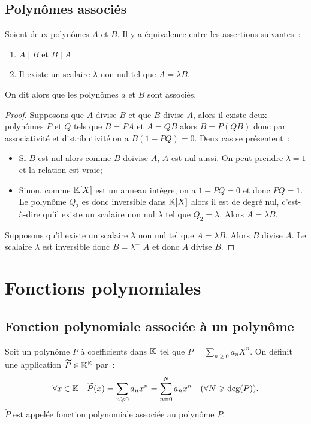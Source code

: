 \subsection{Polynômes associés}

\begin{prop}
  Soient deux polynômes \(A\) et \(B\). Il y a équivalence entre les assertions suivantes~:
  \begin{enumerate}
  \item \(A\mid{}B\) et \(B\mid{}A\)
  \item Il existe un scalaire \(\lambda\) non nul tel que \(A=\lambda B\).
  \end{enumerate}
  On dit alors que les polynômes \(a\) et \(B\) sont associés.
\end{prop}

\begin{proof}
  Supposons que \(A\) divise \(B\) et que \(B\) divise \(A\), alors il existe deux polynômes \(P\) et \(Q\) tels que \(B=PA\) et \(A=QB\) alors \(B=P(QB)\) donc par associativité et distributivité on a \(B(1-PQ)=0\). Deux cas se présentent~:
  \begin{itemize}
  \item Si \(B\) est nul alors comme \(B\) doivise \(A\), \(A\) est nul aussi. On peut prendre \(\lambda=1\) et la relation est vraie;
  \item Sinon, comme \(\mathbb{K}[X]\) est un anneau intègre, on a \(1-PQ=0\) et donc \(PQ=1\). Le polynôme \(Q_2\) es donc inversible dans \(\mathbb{K}[X]\) alors il est de degré nul, c'est-à-dire qu'il existe un scalaire non nul \(\lambda\) tel que \(Q_2=\lambda\). Alors \(A=\lambda B\).
  \end{itemize}

  Supposons qu'il existe un scalaire \(\lambda\) non nul tel que \(A=\lambda B\). Alors \(B\) divise \(A\). Le scalaire \(\lambda\) est inversible donc \(B=\lambda^{-1}A\) et donc \(A\) divise \(B\).
\end{proof}

\section{Fonctions polynomiales}

\subsection{Fonction polynomiale associée à un polynôme}

\begin{defdef}
  Soit un polynôme \(P\) à coefficients dans \(\mathbb{K}\) tel que \(P=\sum_{n \geqslant 0}a_n X^n\). On définit une application \(\widetilde{P} \in \mathbb{K}^{\mathbb{K}}\) par~:
  \begin{equation}
    \forall x \in \mathbb{K} \quad \widetilde{P}(x) = \sum_{n \geqslant 0} a_n x^n=\sum_{n=0}^N a_n x^n \quad (\forall N \geqslant \deg(P)).
  \end{equation}
  \(\widetilde{P}\) est appelée fonction polynomiale associée au polynôme \(P\).
\end{defdef}

